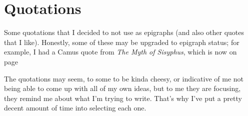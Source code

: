 \documentclass[../butidigress.tex]{subfiles}
\begin{document}
\chapter{Quotations}
\newpage
\newlength{\episkip}
\setlength{\episkip}{0.5cm}
\newcommand{\postepi}{}
Some quotations that I decided to not use as epigraphs (and also other quotes that I like).
Honestly, some of these may be upgraded to epigraph status; for example, I had a Camus quote from \textit{The Myth of Sisyphus}, which is now on page~\pageref{sec:voidexpounding}

The quotations may seem, to some to be kinda cheesy, or indicative of me not being able to come up with all of my own ideas, but to me they are focusing, they remind me about what I'm trying to write.
That's why I've put a pretty decent amount of time into selecting each one.
\end{document}
